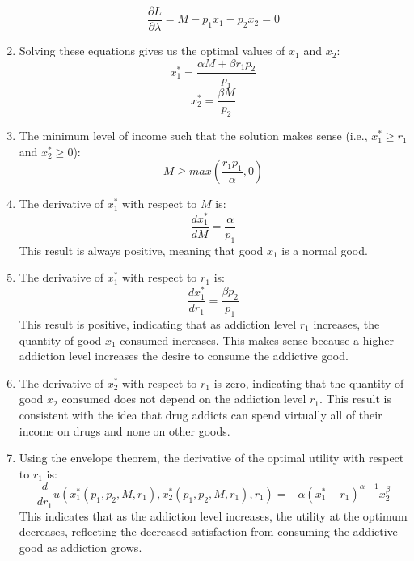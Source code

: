 \documentclass[UTF8,titlepage]{article}
\numberwithin{figure}{section}
\begin{document}
\begin{enumerate}
    \[\frac{\partial L}{\partial \lambda} = M - p_1 x_1 - p_2 x_2 = 0\]
    \item Solving these equations gives us the optimal values of $x_1$ and $x_2$:
    \[x^*_1 = \frac{\alpha M + \beta r_1 p_2}{p_1}\]
    \[x^*_2 = \frac{\beta M}{p_2}\]
    \item The minimum level of income such that the solution makes sense (i.e., $x_1^* \geq r_1$ and $x_2^* \geq 0$):
    \[M \geq max(\frac{r_1 p_1}{\alpha}, 0)\]
    \item The derivative of $x_1^*$ with respect to $M$ is:
    \[\frac{dx^*_1}{dM} = \frac{\alpha}{p_1}\]
    This result is always positive, meaning that good $x_1$ is a normal good.
    \item The derivative of $x_1^*$ with respect to $r_1$ is:
    \[\frac{dx^*_1}{dr_1} = \frac{\beta p_2}{p_1}\]
    This result is positive, indicating that as addiction level $r_1$ increases, the quantity of good $x_1$ consumed increases. This makes sense because a higher addiction level increases the desire to consume the addictive good.
    \item The derivative of $x_2^*$ with respect to $r_1$ is zero, indicating that the quantity of good $x_2$ consumed does not depend on the addiction level $r_1$. This result is consistent with the idea that drug addicts can spend virtually all of their income on drugs and none on other goods.
    \item Using the envelope theorem, the derivative of the optimal utility with respect to $r_1$ is:
    \[\frac{d}{dr_1} u(x_1^*(p_1, p_2, M, r_1), x_2^*(p_1, p_2, M, r_1), r_1) = -\alpha(x_1^* - r_1)^{\alpha-1} x_2^{\beta}\]
    This indicates that as the addiction level increases, the utility at the optimum decreases, reflecting the decreased satisfaction from consuming the addictive good as addiction grows.
\end{enumerate}
\clearpage
\end{document}
